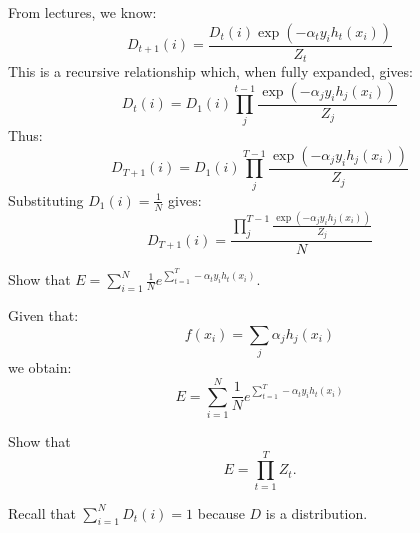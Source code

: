 \begin{solution}
 From lectures, we know:
 \begin{equation}
     D_{t+1}(i) = \frac{D_t(i)\exp{(-\alpha_ty_ih_t(x_i))}}{Z_t}
 \end{equation}
 This is a recursive relationship which, when fully expanded, gives:
 \begin{equation}
    D_{t}(i) =D_1(i)\prod_j^{t-1}\frac{\exp{(-\alpha_jy_ih_j(x_i))}}{Z_j}
\end{equation}
Thus:
\begin{equation}
    D_{T+1}(i) =D_1(i)\prod_j^{T-1}\frac{\exp{(-\alpha_jy_ih_j(x_i))}}{Z_j}
\end{equation}
Substituting $D_1(i)=\frac{1}{N}$ gives:
\begin{equation}
    D_{T+1}(i) =\frac{\prod_j^{T-1}\frac{\exp{(-\alpha_jy_ih_j(x_i))}}{Z_j}}{N}
\end{equation}
\end{solution}

\problem[2]
Show that $E = \sum_{i=1}^N  \frac{1}{N} e^{\sum_{t=1}^T -\alpha_t y_i h_t(x_i)}.$

\begin{solution}
 Given that:
 \begin{equation}
     f(x_i) = \sum_j\alpha_jh_j(x_i)
 \end{equation}
 we obtain:
 \begin{equation}
    E = \sum_{i=1}^N  \frac{1}{N} e^{\sum_{t=1}^T -\alpha_t y_i h_t(x_i)}
 \end{equation}

\end{solution}

\problem[5]
Show that
$$E = \prod\limits_{t=1}^T Z_t.$$

\begin{hint}
	Recall that $\sum_{i = 1}^N D_t(i) = 1$ because $D$ is a distribution.
\end{hint}

